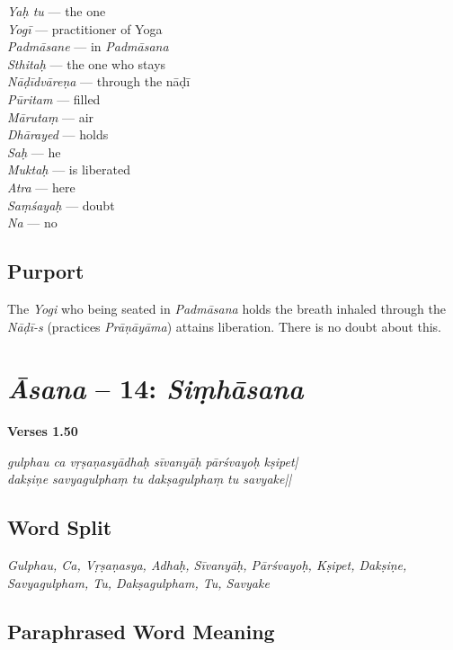 \begin{multicols}{2}
\textit{Yaḥ tu} --- the one   \\
\textit{Yogī} --- practitioner of Yoga \\
\textit{Padmāsane} ---  in \textit{Padmāsana} \\
\textit{Sthitaḥ} --- the one who stays  \\
\textit{Nāḍīdvāreṇa} ---  through the nāḍī \\
\textit{Pūritam} --- filled  \\
\textit{Mārutaṃ} ---  air  \\
\textit{Dhārayed} ---  holds  \\
\textit{Saḥ} ---  he  \\
\textit{Muktaḥ} --- is liberated \\
\textit{Atra} --- here  \\
\textit{Saṃśayaḥ} --- doubt\\
\textit{Na} ---  no
\end{multicols}

\subsection*{Purport}
\vspace{-8pt}
The \textit{Yogi} who being seated in \textit{Padmāsana} holds the breath inhaled through the \textit{Nāḍī-s} (practices \textit{Prāṇāyāma}) attains liberation. There is no doubt about this.

\section*{\textit{Āsana} -- 14: \textit{Siṃhāsana}}


\noindent \textbf{Verses 1.50}

\begin{shloka}
\textit{gulphau ca vṛṣaṇasyādhaḥ sīvanyāḥ pārśvayoḥ kṣipet|\\
dakṣiṇe savyagulphaṃ tu dakṣagulphaṃ tu savyake||}
\end{shloka}

\subsection*{Word Split}

\textit{Gulphau, Ca, Vṛṣaṇasya, Adhaḥ, Sīvanyāḥ, Pārśvayoḥ, Kṣipet, Dakṣiṇe, Savyagulpham, Tu, Dakṣagulpham, Tu, Savyake}

\subsection*{Paraphrased Word Meaning}

